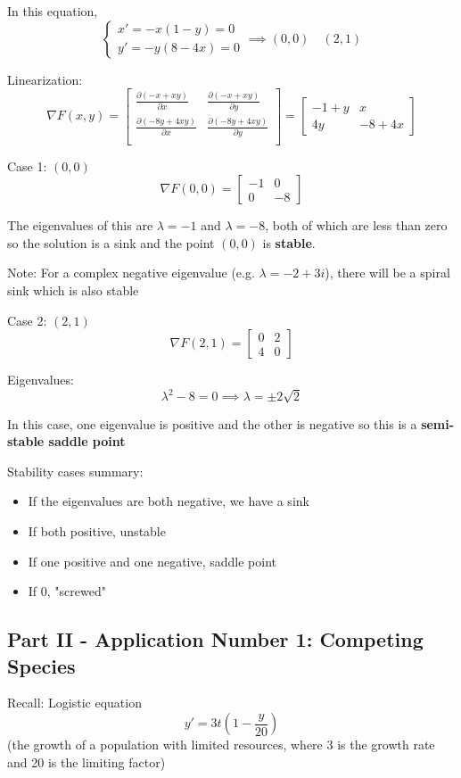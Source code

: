 \documentclass[12pt]{article}
\begin{document}
In this equation,
\[\begin{cases}
    x' = -x(1 - y) = 0\\
    y' = -y(8 - 4x) = 0
\end{cases} \implies (0, 0) \quad (2, 1)\]

Linearization:
\[\nabla F(x, y) = \begin{bmatrix}
    \frac{\partial (-x + xy)}{\partial x} & \frac{\partial (-x + xy)}{\partial y}\\
    \frac{\partial (-8y + 4xy)}{\partial x} & \frac{\partial (-8y + 4xy)}{\partial y}\\
\end{bmatrix} = \begin{bmatrix}
    -1 + y & x\\
    4y & -8 + 4x
\end{bmatrix}\]

Case 1: $(0, 0)$
\[\nabla F(0, 0) = \begin{bmatrix}
    -1 & 0\\
    0 & -8
\end{bmatrix}\]

The eigenvalues of this are $\lambda = -1$ and $\lambda = - 8$, both of which are less than zero so the solution is a sink and the point $(0, 0)$ is \textbf{stable}.

Note: For a complex negative eigenvalue (e.g. $\lambda = -2 + 3i$), there will be a spiral sink which is also stable

Case 2: $(2, 1)$
\[\nabla F(2, 1) = \begin{bmatrix}
    0 & 2\\
    4 & 0
\end{bmatrix}\]

Eigenvalues:
\[\lambda^2 - 8 = 0 \implies \lambda = \pm 2\sqrt{2}\]

In this case, one eigenvalue is positive and the other is negative so this is a \textbf{semi-stable saddle point}

Stability cases summary:
\begin{itemize}
    \item If the eigenvalues are both negative, we have a sink
    \item If both positive, unstable
    \item If one positive and one negative, saddle point
    \item If 0, "screwed"
\end{itemize}

\subsection*{Part II - Application Number 1: Competing Species}
Recall: Logistic equation 
\[y' = 3t \left(1 - \frac{y}{20}\right)\]
(the growth of a population with limited resources, where 3 is the growth rate and 20 is the limiting factor)
\end{document}
